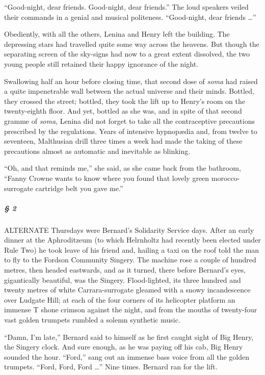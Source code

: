 \documentclass[12pt]{report}
\begin{document}
``Good-night, dear friends. Good-night, dear friends.'' The loud
speakers veiled their commands in a genial and musical politeness.
``Good-night, dear friends \ldots{}''

Obediently, with all the others, Lenina and Henry left the building. The
depressing stars had travelled quite some way across the heavens. But
though the separating screen of the sky-signs had now to a great extent
dissolved, the two young people still retained their happy ignorance of
the night.

Swallowing half an hour before closing time, that second dose of
\emph{soma} had raised a quite impenetrable wall between the actual
universe and their minds. Bottled, they crossed the street; bottled,
they took the lift up to Henry's room on the twenty-eighth floor. And
yet, bottled as she was, and in spite of that second gramme of
\emph{soma}, Lenina did not forget to take all the contraceptive
precautions prescribed by the regulations. Years of intensive hypnopædia
and, from twelve to seventeen, Malthusian drill three times a week had
made the taking of these precautions almost as automatic and inevitable
as blinking.

``Oh, and that reminds me,'' she said, as she came back from the
bathroom, ``Fanny Crowne wants to know where you found that lovely green
morocco-surrogate cartridge belt you gave me.''

\mbox{}%
\subparagraph{§ 2}\label{section}

ALTERNATE Thursdays were Bernard's Solidarity Service days. After an
early dinner at the Aphroditzeum (to which Helrnholtz had recently been
elected under Rule Two) he took leave of his friend and, hailing a taxi
on the roof told the man to fly to the Fordson Community Singery. The
machine rose a couple of hundred metres, then headed eastwards, and as
it turned, there before Bernard's eyes, gigantically beautiful, was the
Singery. Flood-lighted, its three hundred and twenty metres of white
Carrara-surrogate gleamed with a snowy incandescence over Ludgate Hill;
at each of the four corners of its helicopter platform an immense T
shone crimson against the night, and from the mouths of twenty-four vast
golden trumpets rumbled a solemn synthetic music.

``Damn, I'm late,'' Bernard said to himself as he first caught sight of
Big Henry, the Singery clock. And sure enough, as he was paying off his
cab, Big Henry sounded the hour. ``Ford,'' sang out an immense bass
voice from all the golden trumpets. ``Ford, Ford, Ford \ldots{}'' Nine
times. Bernard ran for the lift.
\end{document}
